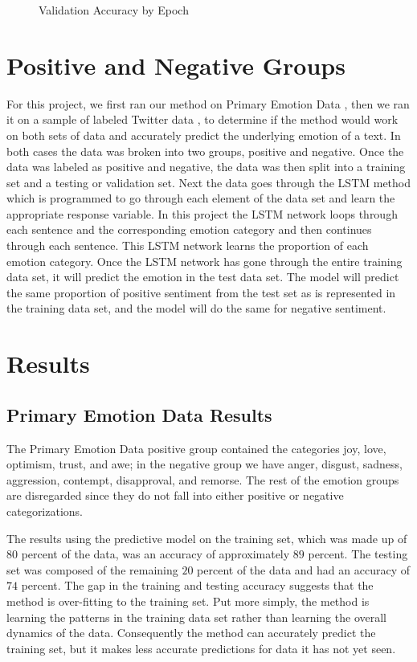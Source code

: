 \documentclass[titlepage,letterpaper]{article}
\begin{document}
\begin{figure}[htb]
	\centering
	\caption{Validation Accuracy by Epoch}
	\resizebox{4in}{!}{}
	\label{valepoch}
\end{figure}

\section{Positive and Negative Groups}

For this project, we first ran our method on Primary Emotion Data \cite{lowriwilliams}, then we ran it on a sample of labeled Twitter data \cite{LabeledTwitter}, to determine if the method would work on both sets of data and accurately predict the underlying emotion of a text. In both cases the data was broken into two groups, positive and negative. Once the data was labeled as positive and negative, the data was then split into a training set and a testing or validation set. Next the data goes through the LSTM method which is programmed to go through each element of the data set and learn the appropriate response variable. In this project the LSTM network loops through each sentence and the corresponding emotion category and then continues through each sentence. This LSTM network learns the proportion of each emotion category. Once the LSTM network has gone through the entire training data set, it will predict the emotion in the test data set. The model will predict the same proportion of positive sentiment from the test set as is represented in the training data set, and the model will do the same for negative sentiment. 

\section{Results}

\subsection{Primary Emotion Data Results}
The Primary Emotion Data positive group contained the categories joy, love, optimism, trust, and awe; in the negative group we have anger, disgust, sadness, aggression, contempt, disapproval, and remorse. The rest of the emotion groups are disregarded since they do not fall into either positive or negative categorizations.

The results using the predictive model on the training set, which was made up of $80$ percent of the data, was an accuracy of approximately $89$ percent. The testing set was composed of the remaining $20$ percent of the data and had an accuracy of $74$ percent. The gap in the training and testing accuracy suggests that the method is over-fitting to  the training set. Put more simply, the method is learning the patterns in the training data set rather than learning the overall dynamics of the data. Consequently the method can accurately predict the training set, but it makes less accurate predictions for data it has not yet seen.
\end{document}
